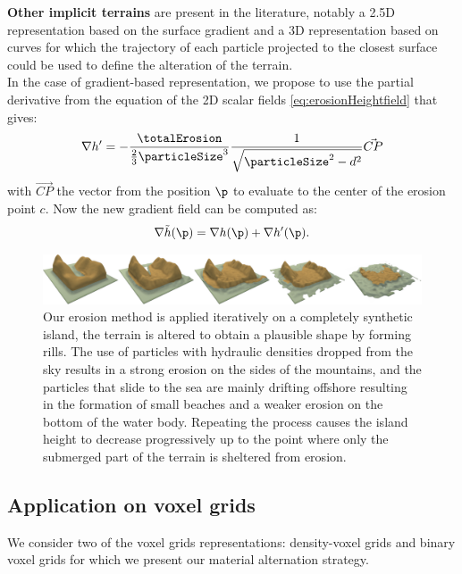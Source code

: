 \textbf{Other implicit terrains}
\label{sec:erosion_application_on_other_implicit}
are present in the literature, notably a 2.5D representation based on the surface gradient \cite{Guerin2022} and a 3D representation based on curves \cite{Becher2017} for which the trajectory of each particle projected to the closest surface could be used to define the alteration of the terrain.\\
In the case of gradient-based representation, we propose to use the partial derivative from the equation of the 2D scalar fields \eqref{eq:erosionHeightfield} that gives:
\begin{align} %
\nabla h' = - \frac{\totalErosion}{\frac{2}{3}\particleSize^3} \frac{1}{\sqrt{\particleSize^2 - d^2} } \vec{CP}
\end{align}
with $\vec{CP}$ the vector from the position $\p$ to evaluate to the center of the erosion point $c$.
Now the new gradient field can be computed as: 
$$
\nabla \Tilde{h}(\p) = \nabla h(\p) + \nabla h'(\p).
$$
\begin{figure}
\centering
\includegraphics{figures/new_continuous_erosion2.png}
\caption{Our erosion method is applied iteratively on a completely synthetic island, the terrain is altered to obtain a plausible shape by forming rills. The use of particles with hydraulic densities dropped from the sky results in a strong erosion on the sides of the mountains, and the particles that slide to the sea are mainly drifting offshore resulting in the formation of small beaches and a weaker erosion on the bottom of the water body. Repeating the process causes the island height to decrease progressively up to the point where only the submerged part of the terrain is sheltered from erosion.}
\label{fig:erosion_continuous-erosion}

\end{figure}

\subsection{Application on voxel grids}
\label{sec:erosion_application_on_voxels}
We consider two of the voxel grids representations: density-voxel grids and binary voxel grids for which we present our material alternation strategy.

